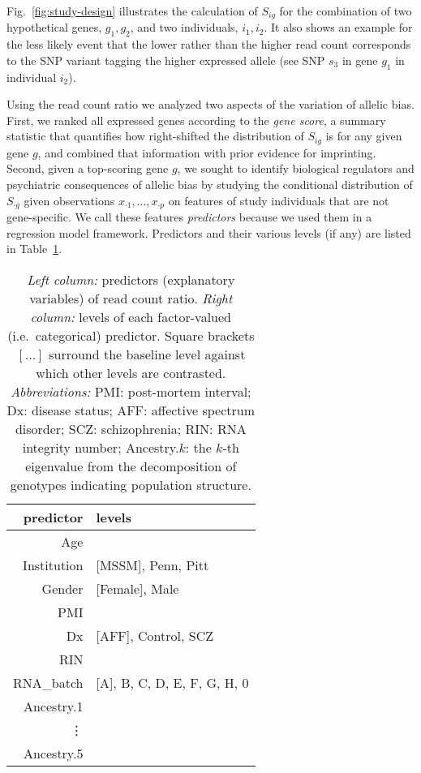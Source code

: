 \documentclass[12pt,letterpaper]{article}
\begin{document}
Fig.~\ref{fig:study-design} illustrates the calculation of \(S_{ig}\) for the
combination of two hypothetical genes, \(g_1,g_2\), and two individuals,
\(i_1,i_2\).  It also shows an example for the less likely event that the lower rather
than the higher read count corresponds to the SNP variant tagging the higher
expressed allele (see SNP \(s_3\) in gene \(g_1\) in individual \(i_2\)).

Using the read count ratio we analyzed two aspects of the variation of allelic
bias.  First, we ranked all expressed genes according to the \emph{gene
score}, a summary statistic that quantifies how right-shifted the distribution
of \(S_{ig}\) is for any given gene \(g\), and combined that information with
prior evidence for imprinting.  Second, given a top-scoring gene \(g\), we
sought to identify biological regulators and psychiatric consequences of
allelic bias by studying the conditional distribution of \(S_{\cdot g}\) given
observations \(x_{\cdot 1},...,x_{\cdot p}\) on features of study individuals
that are not gene-specific. We call these features \emph{predictors} because
we used them in a regression model framework.  Predictors and their various
levels (if any) are listed in Table~\ref{tab:predictors}.

\begin{table}
\begin{center}
\begin{tabular}{r|l}
predictor & levels\\
\hline
Age &  \\
Institution & [MSSM], Penn, Pitt\\
Gender & [Female], Male\\
PMI & \\
Dx & [AFF], Control, SCZ\\
RIN &  \\
RNA\_batch & [A], B, C, D, E, F, G, H, 0\\
Ancestry.1 & \\
\vdots & \\
Ancestry.5 &  \\
\end{tabular}
\caption{ \emph{Left column:} predictors (explanatory variables) of read count
ratio.  \emph{Right column:} levels of each factor-valued (i.e.~categorical)
predictor.  Square brackets \([...]\) surround the baseline level against
which other levels are contrasted.  \emph{Abbreviations:} PMI: post-mortem
interval; Dx: disease status; AFF: affective spectrum disorder; SCZ:
schizophrenia; RIN: RNA integrity number;
Ancestry.\(k\): the \(k\)-th eigenvalue from the decomposition of genotypes
indicating population structure.}
\label{tab:predictors}
\end{center}
\end{table}
\end{document}
